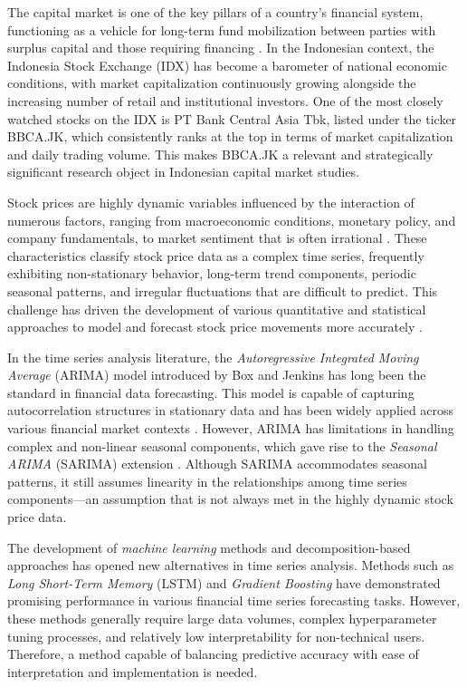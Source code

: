 \documentclass[11pt,twoside]{article}
\begin{document}
The capital market is one of the key pillars of a country's financial system, functioning as a vehicle for long-term fund mobilization between parties with surplus capital and those requiring financing \cite{Tandelilin2010}. In the Indonesian context, the Indonesia Stock Exchange (IDX) has become a barometer of national economic conditions, with market capitalization continuously growing alongside the increasing number of retail and institutional investors. One of the most closely watched stocks on the IDX is PT Bank Central Asia Tbk, listed under the ticker BBCA.JK, which consistently ranks at the top in terms of market capitalization and daily trading volume. This makes BBCA.JK a relevant and strategically significant research object in Indonesian capital market studies.

Stock prices are highly dynamic variables influenced by the interaction of numerous factors, ranging from macroeconomic conditions, monetary policy, and company fundamentals, to market sentiment that is often irrational \cite{Fama1970}. These characteristics classify stock price data as a complex time series, frequently exhibiting non-stationary behavior, long-term trend components, periodic seasonal patterns, and irregular fluctuations that are difficult to predict. This challenge has driven the development of various quantitative and statistical approaches to model and forecast stock price movements more accurately \cite{Box2015}.

In the time series analysis literature, the \textit{Autoregressive Integrated Moving Average} (ARIMA) model introduced by Box and Jenkins \cite{Box2015} has long been the standard in financial data forecasting. This model is capable of capturing autocorrelation structures in stationary data and has been widely applied across various financial market contexts \cite{Mondal2014}. However, ARIMA has limitations in handling complex and non-linear seasonal components, which gave rise to the \textit{Seasonal ARIMA} (SARIMA) extension \cite{Hyndman2018}. Although SARIMA accommodates seasonal patterns, it still assumes linearity in the relationships among time series components—an assumption that is not always met in the highly dynamic stock price data.

The development of \textit{machine learning} methods and decomposition-based approaches has opened new alternatives in time series analysis. Methods such as \textit{Long Short-Term Memory} (LSTM) \cite{Hochreiter1997} and \textit{Gradient Boosting} \cite{Chen2016} have demonstrated promising performance in various financial time series forecasting tasks. However, these methods generally require large data volumes, complex hyperparameter tuning processes, and relatively low interpretability for non-technical users. Therefore, a method capable of balancing predictive accuracy with ease of interpretation and implementation is needed.
\end{document}
